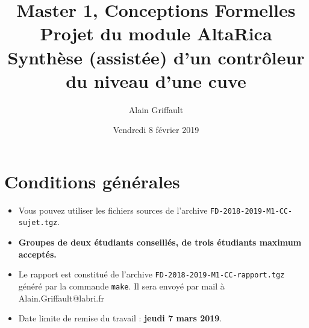 \documentclass[a4paper]{article}
\newcommand{\altarica}{{\sc AltaRica}}
\begin{document}
\title{Master 1, Conceptions Formelles\\
Projet du module \altarica\\
Synthèse (assistée) d'un contrôleur du niveau d'une cuve}

\date{Vendredi 8 février 2019}

\author{Alain Griffault}

\maketitle



\section{Conditions générales}

\begin{itemize}
\item Vous pouvez utiliser les fichiers sources de l'archive {\tt FD-2018-2019-M1-CC-sujet.tgz}.
\item {\bf Groupes de deux étudiants conseillés, de trois étudiants maximum acceptés.}
\item Le rapport est constitué de l'archive {\tt FD-2018-2019-M1-CC-rapport.tgz} généré par la commande {\tt make}. Il sera envoyé par mail à Alain.Griffault@labri.fr
\item Date limite de remise du travail : {\bf jeudi 7 mars 2019}.
\end{itemize}
\end{document}
